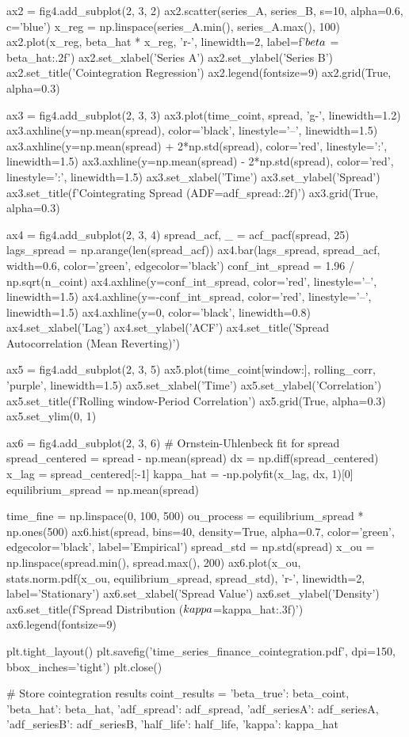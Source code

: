 \documentclass[a4paper, 11pt]{article}
\begin{document}
\begin{pycode}
ax2 = fig4.add_subplot(2, 3, 2)
ax2.scatter(series_A, series_B, s=10, alpha=0.6, c='blue')
x_reg = np.linspace(series_A.min(), series_A.max(), 100)
ax2.plot(x_reg, beta_hat * x_reg, 'r-', linewidth=2,
         label=f'$\\beta$ = {beta_hat:.2f}')
ax2.set_xlabel('Series A')
ax2.set_ylabel('Series B')
ax2.set_title('Cointegration Regression')
ax2.legend(fontsize=9)
ax2.grid(True, alpha=0.3)

ax3 = fig4.add_subplot(2, 3, 3)
ax3.plot(time_coint, spread, 'g-', linewidth=1.2)
ax3.axhline(y=np.mean(spread), color='black', linestyle='--', linewidth=1.5)
ax3.axhline(y=np.mean(spread) + 2*np.std(spread), color='red',
            linestyle=':', linewidth=1.5)
ax3.axhline(y=np.mean(spread) - 2*np.std(spread), color='red',
            linestyle=':', linewidth=1.5)
ax3.set_xlabel('Time')
ax3.set_ylabel('Spread')
ax3.set_title(f'Cointegrating Spread (ADF={adf_spread:.2f})')
ax3.grid(True, alpha=0.3)

ax4 = fig4.add_subplot(2, 3, 4)
spread_acf, _ = acf_pacf(spread, 25)
lags_spread = np.arange(len(spread_acf))
ax4.bar(lags_spread, spread_acf, width=0.6, color='green', edgecolor='black')
conf_int_spread = 1.96 / np.sqrt(n_coint)
ax4.axhline(y=conf_int_spread, color='red', linestyle='--', linewidth=1.5)
ax4.axhline(y=-conf_int_spread, color='red', linestyle='--', linewidth=1.5)
ax4.axhline(y=0, color='black', linewidth=0.8)
ax4.set_xlabel('Lag')
ax4.set_ylabel('ACF')
ax4.set_title('Spread Autocorrelation (Mean Reverting)')

ax5 = fig4.add_subplot(2, 3, 5)
ax5.plot(time_coint[window:], rolling_corr, 'purple', linewidth=1.5)
ax5.set_xlabel('Time')
ax5.set_ylabel('Correlation')
ax5.set_title(f'Rolling {window}-Period Correlation')
ax5.grid(True, alpha=0.3)
ax5.set_ylim(0, 1)

ax6 = fig4.add_subplot(2, 3, 6)
# Ornstein-Uhlenbeck fit for spread
spread_centered = spread - np.mean(spread)
dx = np.diff(spread_centered)
x_lag = spread_centered[:-1]
kappa_hat = -np.polyfit(x_lag, dx, 1)[0]
equilibrium_spread = np.mean(spread)

time_fine = np.linspace(0, 100, 500)
ou_process = equilibrium_spread * np.ones(500)
ax6.hist(spread, bins=40, density=True, alpha=0.7, color='green',
         edgecolor='black', label='Empirical')
spread_std = np.std(spread)
x_ou = np.linspace(spread.min(), spread.max(), 200)
ax6.plot(x_ou, stats.norm.pdf(x_ou, equilibrium_spread, spread_std),
         'r-', linewidth=2, label='Stationary')
ax6.set_xlabel('Spread Value')
ax6.set_ylabel('Density')
ax6.set_title(f'Spread Distribution ($\\kappa$={kappa_hat:.3f})')
ax6.legend(fontsize=9)

plt.tight_layout()
plt.savefig('time_series_finance_cointegration.pdf', dpi=150, bbox_inches='tight')
plt.close()

# Store cointegration results
coint_results = {
    'beta_true': beta_coint,
    'beta_hat': beta_hat,
    'adf_spread': adf_spread,
    'adf_seriesA': adf_seriesA,
    'adf_seriesB': adf_seriesB,
    'half_life': half_life,
    'kappa': kappa_hat
}
\end{pycode}
\end{document}
